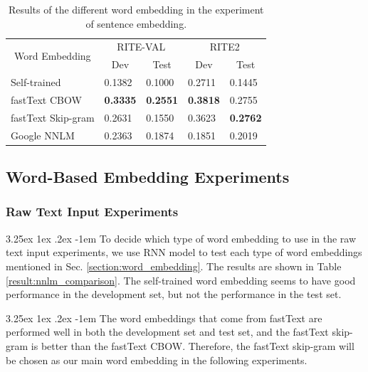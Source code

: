 \documentclass[12pt]{article}
\makeatletter
\renewcommand\paragraph{\@startsection{paragraph}{5}{\z@}%
  {3.25ex \@plus1ex \@minus.2ex}%
  {-1em}%
  {\normalfont\normalsize\bfseries}}
\makeatother
\begin{document}
\begin{CJK*}{UTF8}{bkai}
\begin{spacing}{1.77}
\begin{table}[H]
  \centering
  \setlength{\extrarowheight}{-3pt}
  \caption{Results of the different word embedding in the experiment of sentence embedding.}
  \label{result:sent_emb_nnlm}
  \begin{tabular}{|l|l|l|l|l|}
  \hline
  \multicolumn{1}{|c|}{\multirow{2}{*}{Word   Embedding}} & \multicolumn{2}{c|}{RITE-VAL} & \multicolumn{2}{c|}{RITE2} \\ \cline{2-5}
  \multicolumn{1}{|c|}{} & \multicolumn{1}{c|}{Dev} & \multicolumn{1}{c|}{Test} & \multicolumn{1}{c|}{Dev} & \multicolumn{1}{c|}{Test} \\ \hline
  Self-trained & 0.1382 & 0.1000 & 0.2711 & 0.1445 \\ \hline
  fastText CBOW & \textbf{0.3335} & \textbf{0.2551} & \textbf{0.3818} & 0.2755 \\ \hline
  fastText Skip-gram & 0.2631 & 0.1550 & 0.3623 & \textbf{0.2762} \\ \hline
  Google NNLM & 0.2363 & 0.1874 & 0.1851 & 0.2019 \\ \hline
  \end{tabular}
\end{table}

\subsection{Word-Based Embedding Experiments}
\subsubsection{Raw Text Input Experiments}
\paragraph{}
To decide which type of word embedding to use in the raw text input experiments, we use RNN model to test each type of word embeddings mentioned in Sec. \ref{section:word_embedding}. The results are shown in Table \ref{result:nnlm_comparison}. The self-trained word embedding seems to have good performance in the development set, but not the performance in the test set.

\paragraph{}
The word embeddings that come from fastText are performed well in both the development set and test set, and the fastText skip-gram is better than the fastText CBOW. Therefore, the fastText skip-gram will be chosen as our main word embedding in the following experiments.


\end{spacing}
\end{CJK*}
\end{document}
